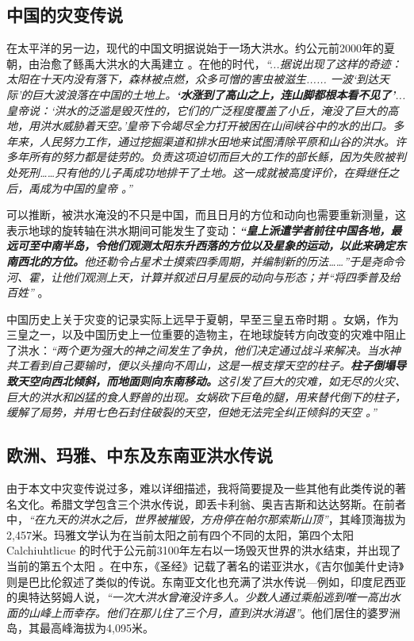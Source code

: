\documentclass[10pt,twocolumn,letterpaper]{article}
\begin{document}
\subsection{中国的灾变传说}

在太平洋的另一边，现代的中国文明据说始于一场大洪水。约公元前2000年的夏朝，由治愈了鲧禹大洪水的大禹建立 \cite{6}。在他的时代，\textit{“...据说出现了这样的奇迹：太阳在十天内没有落下，森林被点燃，众多可憎的害虫被滋生...... 一波‘到达天际’的巨大波浪落在中国的土地上。\textbf{‘水涨到了高山之上，连山脚都根本看不见了’}...皇帝说：‘洪水的泛滥是毁灭性的，它们的广泛程度覆盖了小丘，淹没了巨大的高地，用洪水威胁着天空。’皇帝下令竭尽全力打开被困在山间峡谷中的水的出口。多年来，人民努力工作，通过挖掘渠道和排水田地来试图清除平原和山谷的洪水。许多年所有的努力都是徒劳的。负责这项迫切而巨大的工作的部长鲧，因为失败被判处死刑……只有他的儿子禹成功地排干了土地。这一成就被高度评价，在舜继任之后，禹成为中国的皇帝 \cite{5}。”}

可以推断，被洪水淹没的不只是中国，而且日月的方位和动向也需要重新测量，这表示地球的旋转轴在洪水期间可能发生了变动：\textit{\textbf{“皇上派遣学者前往中国各地，最远可至中南半岛，令他们观测太阳东升西落的方位以及星象的运动，以此来确定东南西北的方位。}他还勒令占星术士摸索四季周期，并编制新的历法……”于是尧命令河、霍，让他们观测上天，计算并叙述日月星辰的动向与形态；并“将四季普及给百姓”} \cite{5}。

中国历史上关于灾变的记录实际上远早于夏朝，早至三皇五帝时期 \cite{7}。女娲，作为三皇之一，以及中国历史上一位重要的造物主，在地球旋转方向改变的灾难中阻止了洪水：\textit{“两个更为强大的神之间发生了争执，他们决定通过战斗来解决。当水神共工看到自己要输时，便以头撞向不周山，这是一根支撑天空的柱子。\textbf{柱子倒塌导致天空向西北倾斜，而地面则向东南移动。}这引发了巨大的灾难，如无尽的火灾、巨大的洪水和凶猛的食人野兽的出现。女娲砍下巨龟的腿，用来替代倒下的柱子，缓解了局势，并用七色石封住破裂的天空，但她无法完全纠正倾斜的天空 \cite{8}。”}

\subsection{欧洲、玛雅、中东及东南亚洪水传说}

由于本文中灾变传说过多，难以详细描述，我将简要提及一些其他有此类传说的著名文化。希腊文学包含三个洪水传说，即丢卡利翁、奥吉吉斯和达达努斯\cite{9,10}。在前者中，\textit{“在九天的洪水之后，世界被摧毁，方舟停在帕尔那索斯山顶”}，其峰顶海拔为2,457米\cite{11}。玛雅文学认为在当前太阳之前有四个不同的太阳，第四个太阳 Calchiuhtlicue 的时代于公元前3100年左右以一场毁灭世界的洪水结束，并出现了当前的第五个太阳 \cite{12}。在中东，《圣经》记载了著名的诺亚洪水，《吉尔伽美什史诗》则是巴比伦叙述了类似的传说\cite{13}。东南亚文化也充满了洪水传说—例如，印度尼西亚的奥特达努姆人说，\textit{“一次大洪水曾淹没许多人。少数人通过乘船逃到唯一高出水面的山峰上而幸存。他们在那儿住了三个月，直到洪水消退”}\cite{3}。他们居住的婆罗洲岛，其最高峰海拔为4,095米。
\end{document}
